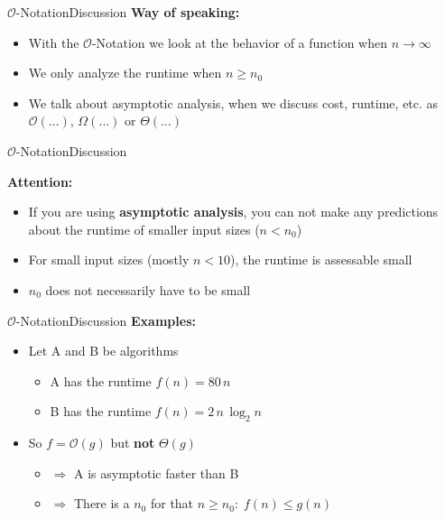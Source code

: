 \begin{frame}{$\mathcal{O}$-Notation}{Discussion}
  \textbf{Way of speaking:}
  \begin{itemize}
    \item
      With the $\mathcal{O}$-Notation we look at the behavior of a function when
      $n \to \infty$
    \item
      We only analyze the runtime when $n \geq n_0$
    \item
      We talk about {\color{Mittel-Blau}asymptotic analysis}, when we discuss 
      cost, runtime, etc. as $\mathcal{O}(\ldots)$, $\Omega(\ldots)$
      or $\Theta(\ldots)$
  \end{itemize}
\end{frame}


\begin{frame}{$\mathcal{O}$-Notation}{Discussion}
  \begin{alertblock}{\textbf{Attention:}}
    \begin{itemize}
      \item
        If you are using \textbf{asymptotic analysis}, you can not make any
        predictions about the runtime of smaller input sizes ($n < n_0$)
      \item
        For small input sizes (mostly $n < 10$),
        the runtime is assessable small
      \item
        $n_0$ does not necessarily have to be small
    \end{itemize}
  \end{alertblock}
\end{frame}


\begin{frame}{$\mathcal{O}$-Notation}{Discussion}
  \textbf{Examples:}
  \begin{itemize}
    \item
    Let A and B be algorithms
    \begin{itemize}
      \item
        A has the runtime $f(n) = 80 \, n$
      \item
        B has the runtime $f(n) = 2 \, n \, \log_2 n$
    \end{itemize}
    \item
      So $f = \mathcal{O}(g)$ but \textbf{not} $\Theta(g)$
      \begin{itemize}
        \item
          $\Rightarrow$ A is asymptotic faster than B
        \item
          $\Rightarrow$
          There is a $n_0$ for that $n \geq n_0\!: \; f(n) \leq g(n)$
      \end{itemize}
  \end{itemize}
\end{frame}

